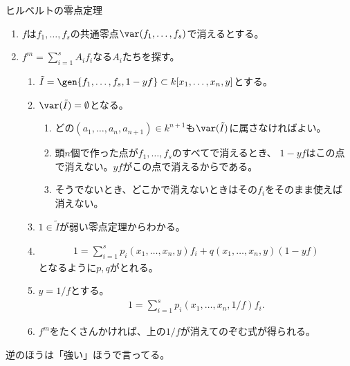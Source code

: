 ヒルベルトの零点定理
\begin{enumerate}
  \item $f$は$f_1,\dots,f_s$の共通零点$\var(f_1,\dots,f_s)$で消えるとする。
  \item $f^m = \sum_{i=1}^s A_i f_i$なる$A_i$たちを探す。
  \begin{enumerate}
    \item $\tilde I = \gen{f_1,\dots,f_s,1-yf} \subset k[x_1,\dots,x_n,y]$とする。
    \item $\var(\tilde I) = \emptyset$となる。
    \begin{enumerate}
      \item どの$(a_1,\dots,a_n,a_{n+1})\in  k^{n+1}$も$\var(\tilde I)$に属さなければよい。
      \item 頭$n$個で作った点が$f_1,\dots,f_s$のすべてで消えるとき、
      $1-yf$はこの点で消えない。$yf$がこの点で消えるからである。
      \item そうでないとき、どこかで消えないときはその$f_i$をそのまま使えば
      消えない。
    \end{enumerate}
    \item $1 \in \tilde I$が弱い零点定理からわかる。
    \item
    \begin{align}
      1 = \sum_{i=1}^s p_i(x_1,\dots,x_n,y)f_i
      +
      q(x_1,\dots,x_n,y)(1-yf)
    \end{align}
    となるように$p,q$がとれる。
    \item
    $y=1/f$とする。
    \begin{align}
      1=\sum_{i=1}^s p_i(x_1,\dots,x_n,1/f)f_i.
    \end{align}
    \item
    $f^m$をたくさんかければ、上の$1/f$が消えてのぞむ式が得られる。
  \end{enumerate}
\end{enumerate}

逆のほうは「強い」ほうで言ってる。
